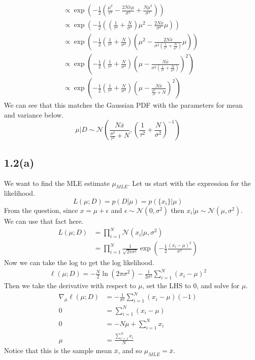 \documentclass[submit]{harvardml}
\begin{document}
\begin{align*}
    &\propto \exp\left(-\frac{1}{2}\left( \frac{\mu^2}{\tau^2} - \frac{2 N \bar{x} \mu}{\sigma^2} + \frac{N \mu^2}{\sigma^2} \right) \right) \\
    &\propto \exp\left(-\frac{1}{2}\left( \left(\frac{1}{\tau^2} + \frac{N}{\sigma^2}\right) \mu^2 - \frac{2 N \bar{x}}{\sigma^2} \mu \right) \right) \\
    &\propto \exp\left(-\frac{1}{2}\left(\frac{1}{\tau^2} + \frac{N}{\sigma^2}\right) \left( \mu^2 - \frac{2 N \bar{x}}{\sigma^2 \left(\frac{1}{\tau^2} + \frac{N}{\sigma^2}\right)} \mu \right) \right) \\
    &\propto \exp\left(-\frac{1}{2}\left(\frac{1}{\tau^2} + \frac{N}{\sigma^2}\right) \left( \mu - \frac{N \bar{x}}{\sigma^2 \left(\frac{1}{\tau^2} + \frac{N}{\sigma^2}\right)} \right)^2 \right) \\
    &\propto \exp\left(-\frac{1}{2}\left(\frac{1}{\tau^2} + \frac{N}{\sigma^2}\right) \left( \mu - \frac{N \bar{x}}{\frac{\sigma^2}{\tau^2} + N} \right)^2 \right)
\end{align*}
We can see that this matches the Gaussian PDF with the parameters for mean and variance below.
\begin{equation*}
    \boxed{\mu | D \sim \mathcal{N}\left(\frac{N \bar{x}}{\frac{\sigma^2}{\tau^2} + N}, \left(\frac{1}{\tau^2} + \frac{N}{\sigma^2}\right)^{-1} \right)}
\end{equation*}

\subsection*{1.2(a)}
We want to find the MLE estimate $\mu_{MLE}$. Let us start with the expression for the likelihood.
\begin{equation*}
    L(\mu ; D) = p(D | \mu) = p(\{ x_i \} | \mu)
\end{equation*}
From the question, since $x = \mu + \epsilon$ and $\epsilon \sim \mathcal{N}(0, \sigma^2)$ then $x_i | \mu \sim \mathcal{N}(\mu, \sigma^2)$. We can use that fact here.
\begin{align*}
    L(\mu ; D) &= \prod_{i=1}^N \mathcal{N}(x_i | \mu, \sigma^2) \\
    &= \prod_{i=1}^N \frac{1}{\sqrt{2 \pi \sigma^2}} \exp\left(-\frac{1}{2} \frac{(x_i - \mu)^2}{\sigma^2}\right)
\end{align*}
Now we can take the log to get the log likelihood.
\begin{align*}
    \ell(\mu ; D) = -\frac{N}{2} \ln(2 \pi \sigma^2) - \frac{1}{2 \sigma^2} \sum_{i=1}^N (x_i - \mu)^2
\end{align*}
Then we take the derivative with respect to $\mu$, set the LHS to $0$, and solve for $\mu$.
\begin{align*}
    \nabla_{\mu} \ell(\mu ; D) &= - \frac{1}{\sigma^2} \sum_{i=1}^N (x_i - \mu)(-1) \\
    0 &= \sum_{i=1}^N (x_i - \mu) \\
    0 &= -N \mu + \sum_{i=1}^N x_i \\
    \mu &= \frac{\sum_{i=1}^N x_i}{N}
\end{align*}
Notice that this is the sample mean $\bar{x}$, and so $\boxed{\mu_{MLE} = \bar{x}}$.
\end{document}
